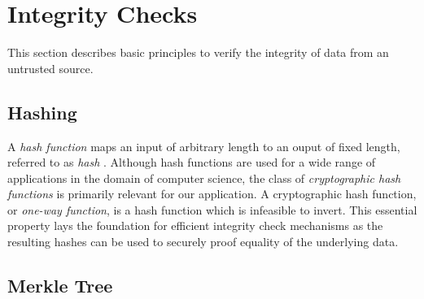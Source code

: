 \section{Integrity Checks}


	This section describes basic principles to verify the integrity of data from an untrusted source.

	\subsection{Hashing}
	\label{subsec:hashing}

		A \emph{hash function} maps an input of arbitrary length to an ouput of fixed length, referred to as \emph{hash} \cite{menezes1996}.
		Although hash functions are used for a wide range of applications in the domain of computer science, the class of \emph{cryptographic hash functions} is primarily relevant for our application.
		A cryptographic hash function, or \emph{one-way function}, is a hash function which is infeasible to invert.
		This essential property lays the foundation for efficient integrity check mechanisms as the resulting hashes can be used to securely proof equality of the underlying data.

	\subsection{Merkle Tree}
	\label{subsec:merkle-tree}

